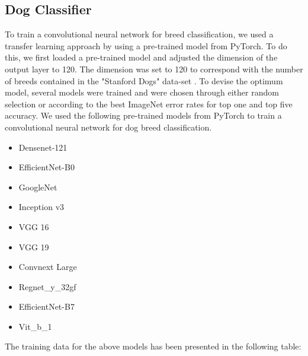 \documentclass{article}
\begin{document}
\newpage
\subsection{Dog Classifier}

To train a convolutional neural network for breed classification, we used a transfer learning approach by using a pre-trained model from PyTorch.  To do this, we first loaded a pre-trained model and adjusted the dimension of the output layer to 120. The dimension was set to 120 to correspond with the number of breeds contained in the  "Stanford Dogs" data-set \cite{stanforddogs}.  To devise the optimum model, several models were trained and were chosen through either random selection or according to the best ImageNet error rates for top one and top five accuracy.  We used the following pre-trained models from PyTorch \cite{torchpretrained}  to train a convolutional neural network for dog breed classification.


 	\begin{itemize}
 	  \item Densenet-121
      \item EfficientNet-B0
      \item GoogleNet
      \item Inception v3
      \item VGG 16
      \item VGG 19
      \item Convnext Large
      \item Regnet\_y\_32gf
      \item EfficientNet-B7
      \item Vit\_b\_1

    \end{itemize}



The training data for the above models has been presented in the following table:
\end{document}
